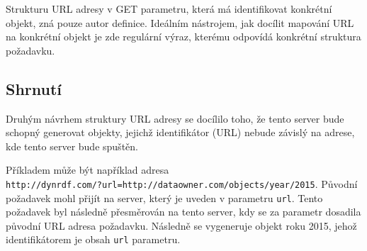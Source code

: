 \documentclass[thesis=B,czech]{FITthesis}[2012/06/26]
\begin{document}
   Strukturu URL adresy v GET parametru, která má identifikovat konkrétní objekt, zná pouze autor definice. Ideálním nástrojem, jak docílit mapování URL na konkrétní
   objekt je zde regulární výraz, kterému odpovídá konkrétní struktura požadavku.
   
\subsection{Shrnutí}
   Druhým návrhem struktury URL adresy se docílilo toho, že tento server bude schopný generovat objekty, jejichž identifikátor (URL) nebude závislý na adrese, kde tento
   server bude spuštěn.
   
   Příkladem může být například adresa \\ \texttt{http://dynrdf.com/?url=http://dataowner.com/objects/year/2015}. Původní požadavek mohl přijít na server, 
   který je uveden v parametru \texttt{url}. Tento požadavek byl následně přesměrován na tento server, kdy se za parametr dosadila 
   původní URL adresa požadavku. Následně se vygeneruje objekt roku 2015, jehož identifikátorem je obsah  \texttt{url} parametru.

   \newpage
   
\end{document}
